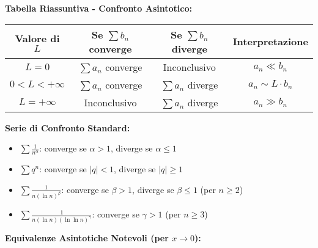 \begin{enumerate}
    \begin{info}
    \textbf{Tabella Riassuntiva - Confronto Asintotico:}
    
    \begin{center}
    \begin{tabular}{|c|c|c|c|}
    \hline
    \textbf{Valore di $L$} & \textbf{Se $\sum b_n$ converge} & \textbf{Se $\sum b_n$ diverge} & \textbf{Interpretazione} \\
    \hline
    $L = 0$ & $\sum a_n$ converge & Inconclusivo & $a_n \ll b_n$ \\
    \hline
    $0 < L < +\infty$ & $\sum a_n$ converge & $\sum a_n$ diverge & $a_n \sim L \cdot b_n$ \\
    \hline
    $L = +\infty$ & Inconclusivo & $\sum a_n$ diverge & $a_n \gg b_n$ \\
    \hline
    \end{tabular}
    \end{center}
    
    \textbf{Serie di Confronto Standard:}
    \begin{itemize}
        \item $\sum \frac{1}{n^\alpha}$: converge se $\alpha > 1$, diverge se $\alpha \leq 1$
        \item $\sum q^n$: converge se $|q| < 1$, diverge se $|q| \geq 1$  
        \item $\sum \frac{1}{n (\ln n)^\beta}$: converge se $\beta > 1$, diverge se $\beta \leq 1$ (per $n \geq 2$)
        \item $\sum \frac{1}{n (\ln n)(\ln \ln n)^\gamma}$: converge se $\gamma > 1$ (per $n \geq 3$)
    \end{itemize}
    \end{info}

    \begin{info}
    \textbf{Equivalenze Asintotiche Notevoli (per $x \to 0$):}
    

\end{info}
\end{enumerate}
